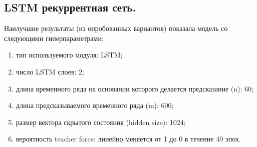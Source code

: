 \documentclass[12pt,a4paper]{article}
\begin{document}
%
%
%


%

\subsection{LSTM рекуррентная сеть.}



\begin{description}
	\item Наилучшие результаты (из опробованных вариантов) показала модель со следующими гиперпараметрами:
	\begin{enumerate}
		\item тип используемого модуля: LSTM;
		\item число LSTM слоев: 2;
		\item длина временного ряда на основании которого делается предсказание (n): 60;
		\item длина предсказываемого временного ряда (m): 600;
		\item размер вектора скрытого состояния (hidden size): 1024;
		\item вероятность teacher force: линейно меняется от 1 до 0 в течение 40 эпох.
	\end{enumerate}
\end{description}
\end{document}
